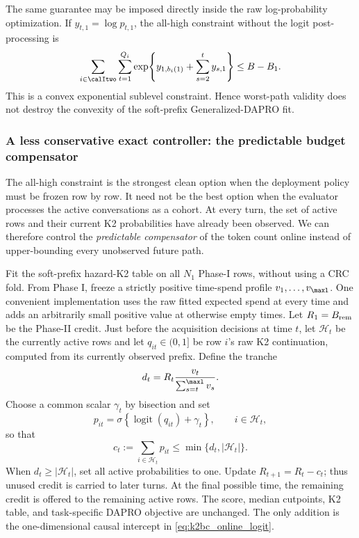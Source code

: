 The same guarantee may be imposed directly inside the raw log-probability
optimization.  If $y_{t,1}=\log p_{t,1}$, the all-high constraint without the
logit post-processing is
\begin{equation}
    \sum_{i\in\calItwo}\sum_{t=1}^{Q_i}
      \exp\!\left\{y_{1,b_i(1)}+
                   \sum_{s=2}^{t}y_{s,1}\right\}
    \leq B-B_1.
    \label{eq:k2bc_convex_worst_path}
\end{equation}
This is a convex exponential sublevel constraint.  Hence worst-path validity
does not destroy the convexity of the soft-prefix Generalized-DAPRO fit.

\subsubsection{A less conservative exact controller: the predictable budget
compensator}
\label{sec:k2bc_online_compensator}

The all-high constraint is the strongest clean option when the deployment
policy must be frozen row by row.  It need not be the best option when the
evaluator processes the active conversations as a cohort.  At every turn, the
set of active rows and their current K2 probabilities have already been
observed.  We can therefore control the \emph{predictable compensator} of the
token count online instead of upper-bounding every unobserved future path.

Fit the soft-prefix hazard-K2 table on all $N_1$ Phase-I rows, without using a
CRC fold.  From Phase I, freeze a strictly positive time-spend profile
$v_1,\ldots,v_{\maxl}$.  One convenient implementation uses the raw fitted
expected spend at every time and adds an arbitrarily small positive value at
otherwise empty times.  Let $R_1=B_{\rm rem}$ be the Phase-II credit.  Just
before the acquisition decisions at time $t$, let $\mathcal H_t$ be the
currently active rows and let $q_{it}\in(0,1]$ be row $i$'s raw K2
continuation, computed from its currently observed prefix.  Define the
tranche
\begin{equation}
    d_t=R_t\frac{v_t}{\sum_{s=t}^{\maxl}v_s}.
    \label{eq:k2bc_tranche}
\end{equation}
Choose a common scalar $\gamma_t$ by bisection and set
\begin{equation}
 p_{it}=\sigma\!\left\{\operatorname{logit}(q_{it})+\gamma_t\right\},
 \qquad i\in\mathcal H_t,
 \label{eq:k2bc_online_logit}
\end{equation}
so that
\begin{equation}
 c_t:=\sum_{i\in\mathcal H_t}p_{it}
 \leq \min\{d_t,|\mathcal H_t|\}.
 \label{eq:k2bc_online_spend}
\end{equation}
When $d_t\geq|\mathcal H_t|$, set all active probabilities to one.  Update
$R_{t+1}=R_t-c_t$; thus unused credit is carried to later turns.  At the final
possible time, the remaining credit is offered to the remaining active rows.
The score, median cutpoints, K2 table, and task-specific DAPRO objective are
unchanged.  The only addition is the one-dimensional causal intercept in
\eqref{eq:k2bc_online_logit}.

